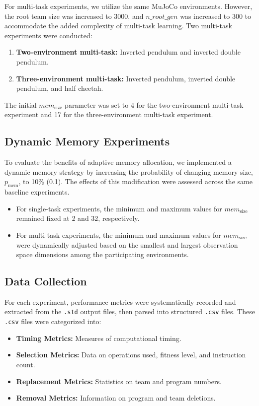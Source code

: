 \documentclass[sigconf]{acmart}
\begin{document}
For multi-task experiments, we utilize the same MuJoCo environments. However, the root team size was increased to 3000,
and $n\_root\_gen$ was increased to 300 to accommodate the added complexity of multi-task learning. Two multi-task
experiments were conducted:

\begin{enumerate}
  \item \textbf{Two-environment multi-task:} Inverted pendulum and inverted double pendulum.
  \item \textbf{Three-environment multi-task:} Inverted pendulum, inverted double pendulum, and half cheetah.
\end{enumerate}

The initial $mem_\text{size}$ parameter was set to 4 for the two-environment multi-task experiment and 17 for the three-environment
multi-task experiment.

\subsection{Dynamic Memory Experiments}
To evaluate the benefits of adaptive memory allocation, we implemented a dynamic memory strategy by increasing the probability
of changing memory size, $p_\text{mem}$, to 10\% (0.1). The effects of this modification were assessed across the same baseline experiments.

\begin{itemize}
  \item For single-task experiments, the minimum and maximum values for $mem_\text{size}$ remained fixed at 2 and 32, respectively.
  \item For multi-task experiments, the minimum and maximum values for $mem_\text{size}$ were dynamically adjusted based on the smallest
  and largest observation space dimensions among the participating environments.
\end{itemize}

\subsection{Data Collection}
For each experiment, performance metrics were systematically recorded and extracted from the \texttt{.std} output files,
then parsed into structured \texttt{.csv} files. These \texttt{.csv} files were categorized into:

\begin{itemize}
  \item \textbf{Timing Metrics:} Measures of computational timing.
  \item \textbf{Selection Metrics:} Data on operations used, fitness level, and instruction count.
  \item \textbf{Replacement Metrics:} Statistics on team and program numbers.
  \item \textbf{Removal Metrics:} Information on program and team deletions.
\end{itemize}
\end{document}
